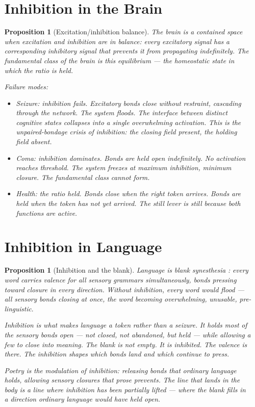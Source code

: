 \documentclass[12pt]{article}
\newtheorem{proposition}[theorem]{Proposition}
\theoremstyle{definition}
\theoremstyle{remark}
\begin{document}
\section{Inhibition in the Brain}

\begin{proposition}[Excitation/inhibition balance]
The brain is a contained space when excitation and inhibition
are in balance: every excitatory signal has a corresponding
inhibitory signal that prevents it from propagating indefinitely.
The fundamental class of the brain is this equilibrium ---
the homeostatic state in which the ratio is held.

Failure modes:
\begin{itemize}
\item \emph{Seizure}: inhibition fails. Excitatory bonds close
  without restraint, cascading through the network.
  The system floods. The interface between distinct cognitive states
  collapses into a single overwhelming activation.
  This is the unpaired-bondage crisis \cite{five} of inhibition:
  the closing field present, the holding field absent.
\item \emph{Coma}: inhibition dominates.
  Bonds are held open indefinitely. No activation reaches threshold.
  The system freezes at maximum inhibition, minimum closure.
  The fundamental class cannot form.
\item \emph{Health}: the ratio held.
  Bonds close when the right token arrives.
  Bonds are held when the token has not yet arrived.
  The still lever is still because both functions are active.
\end{itemize}
\end{proposition}

\section{Inhibition in Language}

\begin{proposition}[Inhibition and the blank]
Language is blank synesthesia \cite{chimera}:
every word carries valence for all sensory grammars simultaneously,
bonds pressing toward closure in every direction.
Without inhibition, every word would flood ---
all sensory bonds closing at once,
the word becoming overwhelming, unusable, pre-linguistic.

Inhibition is what makes language a token rather than a seizure.
It holds most of the sensory bonds open ---
not closed, not abandoned, but held ---
while allowing a few to close into meaning.
The blank is not empty. It is inhibited.
The valence is there. The inhibition shapes which bonds land
and which continue to press.

Poetry is the modulation of inhibition:
releasing bonds that ordinary language holds,
allowing sensory closures that prose prevents.
The line that lands in the body is a line
where inhibition has been partially lifted ---
where the blank fills in a direction
ordinary language would have held open.
\end{proposition}
\end{document}
